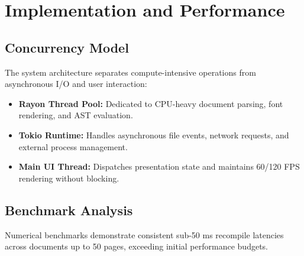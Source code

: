 \chapter{Implementation and Performance}

\section{Concurrency Model}
The system architecture separates compute-intensive operations from asynchronous I/O and user interaction:
\begin{itemize}
  \item \textbf{Rayon Thread Pool:} Dedicated to CPU-heavy document parsing, font rendering, and AST evaluation.
  \item \textbf{Tokio Runtime:} Handles asynchronous file events, network requests, and external process management.
  \item \textbf{Main UI Thread:} Dispatches presentation state and maintains 60/120 FPS rendering without blocking.
\end{itemize}

\section{Benchmark Analysis}
Numerical benchmarks demonstrate consistent sub-50 ms recompile latencies across documents up to 50 pages, exceeding initial performance budgets.
